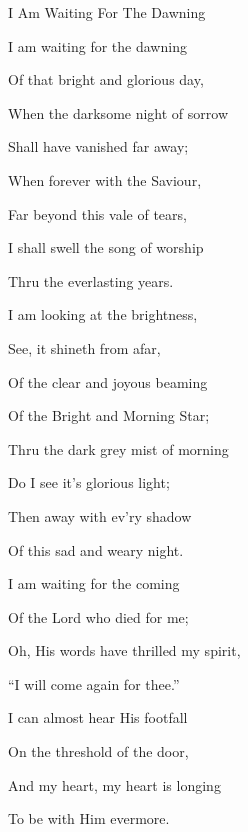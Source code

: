 \documentclass[12pt]{book}
\begin{document}
\begin{song}{I Am Waiting For The Dawning}{}
  {\SBPubDom}
  {}
  {}
  {}

  \begin{SBVerse}
    I am waiting for the dawning

    Of that bright and glorious day,

    When the darksome night of sorrow

    Shall have vanished far away;

    When forever with the Saviour,

    Far beyond this vale of tears,

    I shall swell the song of worship

    Thru the everlasting years.
  \end{SBVerse}

  \begin{SBVerse}
    I am looking at the brightness,

    See, it shineth from afar,

    Of the clear and joyous beaming

    Of the Bright and Morning Star;

    Thru the dark grey mist of morning

    Do I see it's glorious light;

    Then away with ev'ry shadow

    Of this sad and weary night.
  \end{SBVerse}

  \begin{SBVerse}
    I am waiting for the coming

    Of the Lord who died for me;

    Oh, His words have thrilled my spirit,

    ``I will come again for thee.''

    I can almost hear His footfall

    On the threshold of the door,

    And my heart, my heart is longing

    To be with Him evermore.
  \end{SBVerse}
\end{song}
\end{document}
